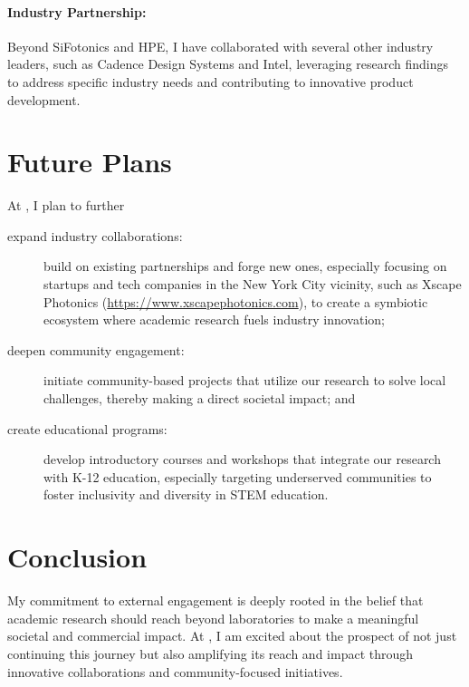 \paragraph{Industry Partnership:} Beyond SiFotonics and HPE, I have collaborated with several other industry leaders, such as Cadence Design Systems and Intel, leveraging research findings to address specific industry needs and contributing to innovative product development.

\section{Future Plans}

At \appEngager{}, I plan to further

\begin{description}
    \item[expand industry collaborations:] build on existing partnerships and forge new ones, especially focusing on startups and tech companies in the New York City vicinity, such as Xscape Photonics (\url{https://www.xscapephotonics.com}), to create a symbiotic ecosystem where academic research fuels industry innovation;
    \item[deepen community engagement:] initiate community-based projects that utilize our research to solve local challenges, thereby making a direct societal impact; and
    \item[create educational programs:] develop introductory courses and workshops that integrate our research with K-12 education, especially targeting underserved communities to foster inclusivity and diversity in STEM education.
\end{description}

\section{Conclusion}

My commitment to external engagement is deeply rooted in the belief that academic research should reach beyond laboratories to make a meaningful societal and commercial impact. At \appEngager{}, I am excited about the prospect of not just continuing this journey but also amplifying its reach and impact through innovative collaborations and community-focused initiatives.